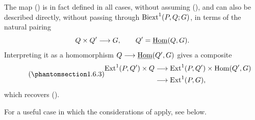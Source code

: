 The map () is in fact defined in all cases, without assuming
(), and can also be described directly, without passing through
$\operatorname{Biext}^1(P,Q;G)$, in terms of the natural pairing
\[
 Q\times Q'\longrightarrow G,
\qquad Q'=\uHom(Q,G).
\]
Interpreting it as a homomorphism
$Q\longrightarrow\uHom(Q',G)$ gives a composite
\begin{equation}\tag{\SGARefTarget{sga7.sga7i.eviii.n1-6-3}{1.6.3}}
\begin{split}
 \Ext^1(P,Q')\times Q
 &\longrightarrow
 \Ext^1(P,Q')\times\Hom(Q',G)\\
 &\longrightarrow
 \Ext^1(P,G),
\end{split}
\end{equation}
which recovers ().

For a useful case in which the considerations of  apply, see 
below.
